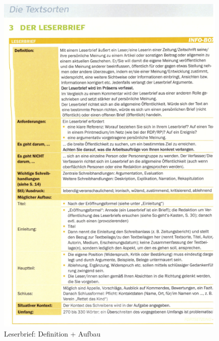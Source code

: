 \begin{figure}[h]
    \centering
    \includegraphics[scale=0.8]{./pics/Screenshot from 2023-02-06 12-28-25.png}
    \caption{Leserbrief: Definition + Aufbau}
    \label{fig:impl:Leserbrief1}
\end{figure}

